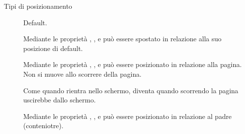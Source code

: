\begin{frame}{Tipi di posizionamento}\transfade\centering
  \begin{description}
    \item[] Default.
    \item[] Mediante le proprietà , ,  e  può essere spostato in relazione alla suo posizione di default.
    \item[] Mediante le proprietà , ,  e  può essere posizionato in relazione alla pagina. Non si muove allo scorrere della pagina.
    \item[] Come  quando rientra nello schermo, diventa  quando scorrendo la pagina uscirebbe dallo schermo.
    \item[] Mediante le proprietà , ,  e  può essere posizionato in relazione al padre (conteniotre).
  \end{description}
\end{frame}

